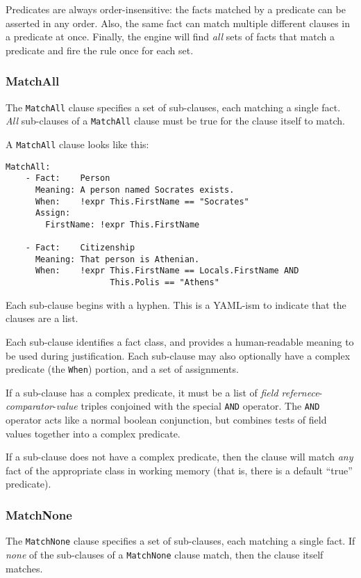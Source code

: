 \documentclass[letterpaper,10pt]{article}
\begin{document}
Predicates are always order-insensitive: the facts matched by a predicate can be asserted in any order.
Also, the same fact can match multiple different clauses in a predicate at once.
Finally, the engine will find \emph{all} sets of facts that match a predicate and fire the rule once for each set.

\subsubsection{MatchAll}
The \texttt{MatchAll} clause specifies a set of sub-clauses, each matching a single fact.
\emph{All} sub-clauses of a \texttt{MatchAll} clause must be true for the clause itself to match.

A \texttt{MatchAll} clause looks like this:
\begin{lstlisting}
MatchAll:
    - Fact:    Person
      Meaning: A person named Socrates exists.
      When:    !expr This.FirstName == "Socrates"
      Assign:
        FirstName: !expr This.FirstName

    - Fact:    Citizenship
      Meaning: That person is Athenian.
      When:    !expr This.FirstName == Locals.FirstName AND
                     This.Polis == "Athens"
\end{lstlisting}

Each sub-clause begins with a hyphen.
This is a YAML-ism to indicate that the clauses are a list.

Each sub-clause identifies a fact class, and provides a human-readable meaning to be used during justification.
Each sub-clause may also optionally have a complex predicate (the \texttt{When}) portion, and a set of assignments.

If a sub-clause has a complex predicate, it must be a list of \emph{field refernece}-\emph{comparator}-\emph{value} triples conjoined with the special \texttt{AND} operator.
The \texttt{AND} operator acts like a normal boolean conjunction, but combines tests of field values together into a complex predicate.

If a sub-clause does not have a complex predicate, then the clause will match \emph{any} fact of the appropriate class in working memory (that is, there is a default ``true'' predicate).

\subsubsection{MatchNone}
The \texttt{MatchNone} clause specifies a set of sub-clauses, each matching a single fact.
If \emph{none} of the sub-clauses of a \texttt{MatchNone} clause match, then the clause itself matches.
\end{document}
